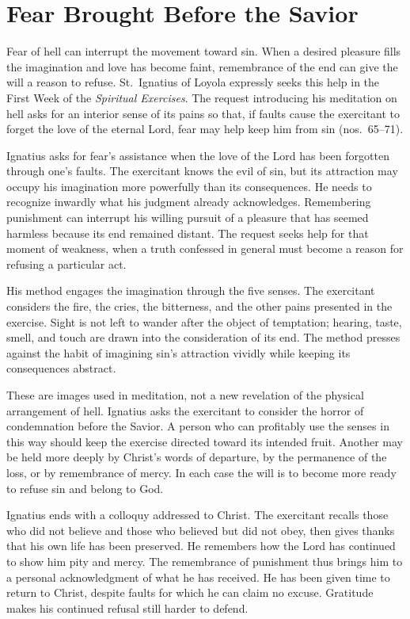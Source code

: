 \section{Fear Brought Before the Savior}

Fear of hell can interrupt the movement toward sin. When a desired pleasure fills the imagination and love has become faint, remembrance of the end can give the will a reason to refuse. St.~Ignatius of Loyola expressly seeks this help in the First Week of the \emph{Spiritual Exercises}. The request introducing his meditation on hell asks for an interior sense of its pains so that, if faults cause the exercitant to forget the love of the eternal Lord, fear may help keep him from sin (nos.~65--71).

Ignatius asks for fear's assistance when the love of the Lord has been forgotten through one's faults. The exercitant knows the evil of sin, but its attraction may occupy his imagination more powerfully than its consequences. He needs to recognize inwardly what his judgment already acknowledges. Remembering punishment can interrupt his willing pursuit of a pleasure that has seemed harmless because its end remained distant. The request seeks help for that moment of weakness, when a truth confessed in general must become a reason for refusing a particular act.

His method engages the imagination through the five senses. The exercitant considers the fire, the cries, the bitterness, and the other pains presented in the exercise. Sight is not left to wander after the object of temptation; hearing, taste, smell, and touch are drawn into the consideration of its end. The method presses against the habit of imagining sin's attraction vividly while keeping its consequences abstract.

These are images used in meditation, not a new revelation of the physical arrangement of hell. Ignatius asks the exercitant to consider the horror of condemnation before the Savior. A person who can profitably use the senses in this way should keep the exercise directed toward its intended fruit. Another may be held more deeply by Christ's words of departure, by the permanence of the loss, or by remembrance of mercy. In each case the will is to become more ready to refuse sin and belong to God.

Ignatius ends with a colloquy addressed to Christ. The exercitant recalls those who did not believe and those who believed but did not obey, then gives thanks that his own life has been preserved. He remembers how the Lord has continued to show him pity and mercy. The remembrance of punishment thus brings him to a personal acknowledgment of what he has received. He has been given time to return to Christ, despite faults for which he can claim no excuse. Gratitude makes his continued refusal still harder to defend.

